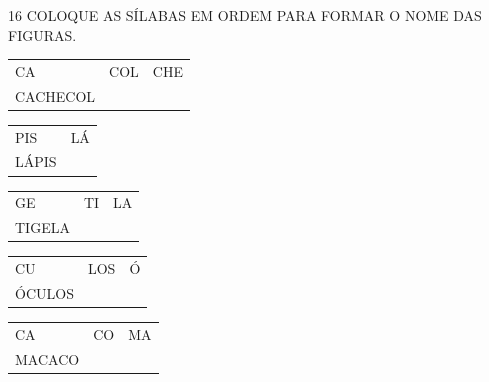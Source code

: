 \begin{escola}

\num{16} COLOQUE AS SÍLABAS EM ORDEM PARA FORMAR O NOME DAS FIGURAS.


\begin{longtable}[]{@{}lll@{}}
\toprule
CA & COL & CHE\tabularnewline
CACHECOL\tabularnewline
\bottomrule
\end{longtable}



\begin{longtable}[]{@{}ll@{}}
\toprule
PIS & LÁ\tabularnewline
LÁPIS\tabularnewline
\bottomrule
\end{longtable}

\begin{longtable}[]{@{}lll@{}}
\toprule
GE & TI & LA\tabularnewline
TIGELA\tabularnewline
\bottomrule
\end{longtable}


\begin{longtable}[]{@{}lll@{}}
\toprule
CU & LOS & Ó\tabularnewline
ÓCULOS\tabularnewline
\bottomrule
\end{longtable}


\begin{longtable}[]{@{}lll@{}}
\toprule
CA & CO & MA\tabularnewline
MACACO\tabularnewline
\bottomrule
\end{longtable}





\end{escola}
